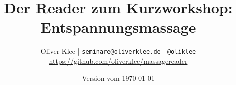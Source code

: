 \documentclass[a4paper,twoside,12pt,titlepage,headsepline]{scrartcl}
\author{Oliver Klee | \texttt{seminare@oliverklee.de} | \texttt{@oliklee}\\\url{https://github.com/oliverklee/massagereader}}
\title{Der Reader zum Kurzworkshop: Entspannungsmassage}
\date{Version vom \today}
\begin{document}
\nocite*{}

\maketitle




\end{document}
